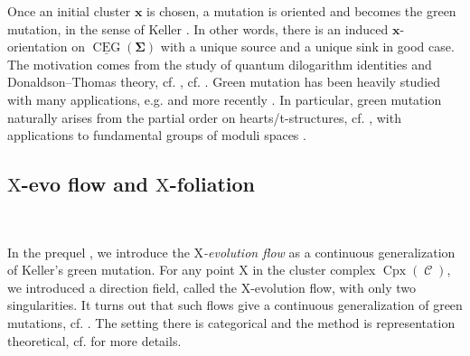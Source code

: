 \documentclass[11pt,reqno]{amsart}
\theoremstyle{plain}
\theoremstyle{definition}
\numberwithin{equation}{section}
\newcommand\hua{\mathcal}
\newcommand\<{\langle}
\renewcommand\>{\rangle}
\newcommand{\C}{\operatorname{\hua{C}}} %
\newcommand{\CEG}{\operatorname{CEG}} %
\newcommand{\uCEG}{\underline{\CEG}} %
\newcommand{\on}[1]{\operatorname{#1}}
\def\CCx{\on{Cpx}}   %
\def\sink{X}
\newcommand{\ccpt}[1]{\mathrm{#1}}%
\def\xevo{\ccpt{X}}%
\def\seeds{\mathbf{\Sigma}}
\def\xx{\mathbf{x}}%
\begin{document}
Once an initial cluster $\xx$ is chosen, a mutation is oriented and becomes the green mutation, in the sense of Keller \cite{Ke2}. 
In other words, there is an induced $\xx$-orientation on $\uCEG(\seeds)$ with a unique source and a unique sink in good case. 
The motivation comes from the study of quantum dilogarithm identities and Donaldson--Thomas theory, cf. \cite{KS,Nag}, cf. \cite{Ke2,Ke3}. 
Green mutation has been heavily studied with many applications, e.g. \cite{BDP} and more recently \cite{Yak}.
In particular, green mutation naturally arises from the partial order on hearts/t-structures, cf. \cite{KQ1,Q1}, with applications to fundamental groups of moduli spaces \cite{KQ2}.

\subsection{$\xevo$-evo flow and $\xevo$-foliation}\

In the prequel \cite{QT}, 
we introduce the \emph{$\xevo$-evolution flow} as a continuous generalization of Keller's green mutation.
For any point $\xevo$ in the cluster complex $\CCx(\C)$, we introduced a direction field, called the $\xevo$-evolution flow, 
with only two singularities.
It turns out that such flows give a continuous generalization of green mutations, cf. \cite[Thm.~5.10]{QT}.
The setting there is categorical and the method is representation theoretical,
cf. \Cref{app:cats} for more details.
\end{document}
